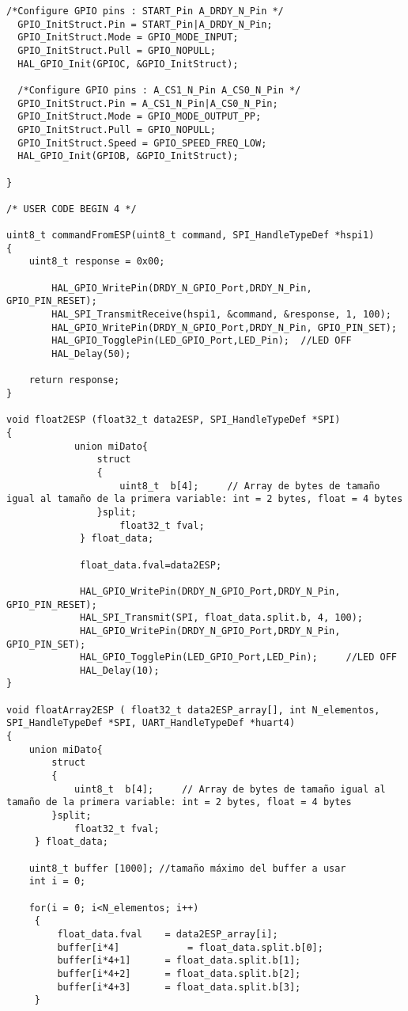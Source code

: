 \begin{lstlisting}[label=algoritmo:main.c,style = STM-code,frame=single,caption=main.c]
  /*Configure GPIO pins : START_Pin A_DRDY_N_Pin */
  GPIO_InitStruct.Pin = START_Pin|A_DRDY_N_Pin;
  GPIO_InitStruct.Mode = GPIO_MODE_INPUT;
  GPIO_InitStruct.Pull = GPIO_NOPULL;
  HAL_GPIO_Init(GPIOC, &GPIO_InitStruct);

  /*Configure GPIO pins : A_CS1_N_Pin A_CS0_N_Pin */
  GPIO_InitStruct.Pin = A_CS1_N_Pin|A_CS0_N_Pin;
  GPIO_InitStruct.Mode = GPIO_MODE_OUTPUT_PP;
  GPIO_InitStruct.Pull = GPIO_NOPULL;
  GPIO_InitStruct.Speed = GPIO_SPEED_FREQ_LOW;
  HAL_GPIO_Init(GPIOB, &GPIO_InitStruct);

}

/* USER CODE BEGIN 4 */

uint8_t commandFromESP(uint8_t command, SPI_HandleTypeDef *hspi1)
{
	uint8_t response = 0x00;	

		HAL_GPIO_WritePin(DRDY_N_GPIO_Port,DRDY_N_Pin, GPIO_PIN_RESET);
		HAL_SPI_TransmitReceive(hspi1, &command, &response, 1, 100);
		HAL_GPIO_WritePin(DRDY_N_GPIO_Port,DRDY_N_Pin, GPIO_PIN_SET);
		HAL_GPIO_TogglePin(LED_GPIO_Port,LED_Pin); 	//LED OFF
		HAL_Delay(50);
	
	return response;
}

void float2ESP (float32_t data2ESP, SPI_HandleTypeDef *SPI)
{	
			union miDato{
				struct
				{
					uint8_t  b[4];     // Array de bytes de tamaño igual al tamaño de la primera variable: int = 2 bytes, float = 4 bytes
				}split;
					float32_t fval;
			 } float_data; 

			 float_data.fval=data2ESP;
			 
			 HAL_GPIO_WritePin(DRDY_N_GPIO_Port,DRDY_N_Pin, GPIO_PIN_RESET);
			 HAL_SPI_Transmit(SPI, float_data.split.b, 4, 100);
			 HAL_GPIO_WritePin(DRDY_N_GPIO_Port,DRDY_N_Pin, GPIO_PIN_SET);
			 HAL_GPIO_TogglePin(LED_GPIO_Port,LED_Pin); 	//LED OFF
			 HAL_Delay(10);
}

void floatArray2ESP ( float32_t data2ESP_array[], int N_elementos, SPI_HandleTypeDef *SPI, UART_HandleTypeDef *huart4)
{
	union miDato{
		struct
		{
			uint8_t  b[4];     // Array de bytes de tamaño igual al tamaño de la primera variable: int = 2 bytes, float = 4 bytes
		}split;
			float32_t fval;
	 } float_data; 
	
	uint8_t buffer [1000]; //tamaño máximo del buffer a usar
	int i = 0;
	 
	for(i = 0; i<N_elementos; i++)
	 {
		 float_data.fval 	= data2ESP_array[i];
		 buffer[i*4] 	 		= float_data.split.b[0];
		 buffer[i*4+1] 		= float_data.split.b[1];
		 buffer[i*4+2] 		= float_data.split.b[2];
		 buffer[i*4+3] 		= float_data.split.b[3];
	 }
	 

\end{lstlisting}

